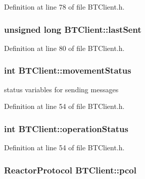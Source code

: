 Definition at line 78 of file B\-T\-Client.\-h.

\hypertarget{classBTClient_a946cc60b431ec813642b97b0c4b76cf3}{
\subsubsection[{last\-Sent}]{\setlength{\rightskip}{0pt plus 5cm}unsigned long B\-T\-Client\-::last\-Sent\hspace{0.3cm}{\ttfamily [private]}}}\label{classBTClient_a946cc60b431ec813642b97b0c4b76cf3}


Definition at line 80 of file B\-T\-Client.\-h.

\hypertarget{classBTClient_aacff467239e0a6a85eab0ac77dbcfdf8}{
\subsubsection[{movement\-Status}]{\setlength{\rightskip}{0pt plus 5cm}int B\-T\-Client\-::movement\-Status}}\label{classBTClient_aacff467239e0a6a85eab0ac77dbcfdf8}


status variables for sending messages 



Definition at line 54 of file B\-T\-Client.\-h.

\hypertarget{classBTClient_a419405603d661e07e630a6649e9592a0}{
\subsubsection[{operation\-Status}]{\setlength{\rightskip}{0pt plus 5cm}int B\-T\-Client\-::operation\-Status}}\label{classBTClient_a419405603d661e07e630a6649e9592a0}


Definition at line 54 of file B\-T\-Client.\-h.

\hypertarget{classBTClient_a64bd4b5e464d0b6a57957428ef559142}{
\subsubsection[{pcol}]{\setlength{\rightskip}{0pt plus 5cm}Reactor\-Protocol B\-T\-Client\-::pcol\hspace{0.3cm}{\ttfamily [private]}}}\label{classBTClient_a64bd4b5e464d0b6a57957428ef559142}


